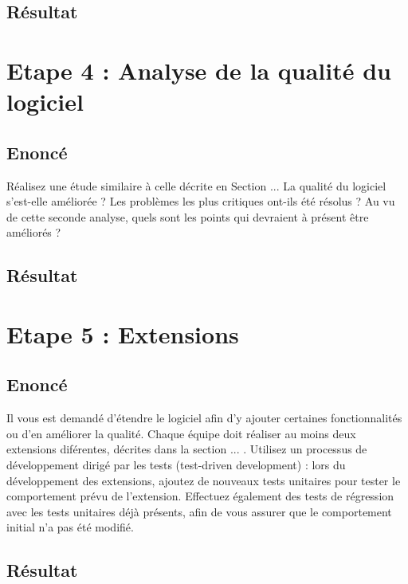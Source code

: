 \documentclass[12pt,a4paper,final]{article}
\begin{document}
\subsection{Résultat}



\newpage
\section{Etape 4 : Analyse de la qualité du logiciel}\label{sec:etape4}
\subsection{Enoncé}
Réalisez une étude similaire à celle décrite en Section ... La qualité du logiciel s'est-elle améliorée ? Les problèmes les plus critiques ont-ils été résolus ? Au vu de cette seconde analyse, quels sont les points qui devraient à présent être améliorés ?
\subsection{Résultat}



\newpage
\section{Etape 5 : Extensions}\label{sec:etape5}
\subsection{Enoncé} 
Il vous est demandé d'étendre le logiciel afin d'y ajouter certaines fonctionnalités ou d'en améliorer la qualité. Chaque équipe doit réaliser au moins deux extensions diférentes, décrites dans la section ... .
Utilisez un processus de développement dirigé par les tests (test-driven development) : lors du développement des extensions, ajoutez de nouveaux tests unitaires pour tester le comportement prévu de l'extension. Effectuez également des tests de régression avec les tests unitaires déjà présents, afin de vous assurer que le comportement initial n'a pas été modifié.
\subsection{Résultat}
\end{document}
